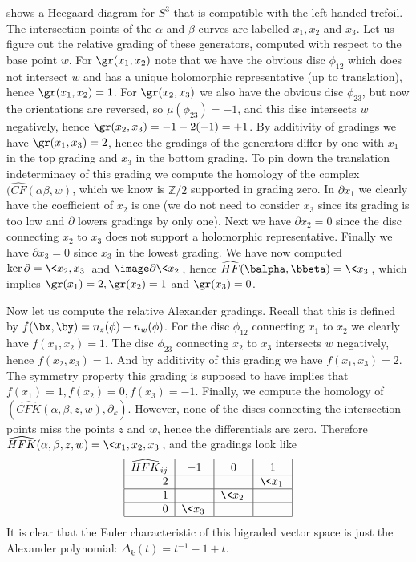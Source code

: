 \begin{example}
 shows a Heegaard diagram for $S^3$ that is compatible with the left-handed trefoil. The intersection points of the $\alpha$ and $\beta$ curves are labelled $x_1,x_2$ and $x_3$. Let us figure out the relative grading of these generators, computed with respect to the base point $w$. For $\gr(x_1,x_2)$ note that we have the obvious disc $\phi_{12}$ which does not intersect $w$ and has a unique holomorphic representative (up to translation), hence $\gr(x_1,x_2)=1$. For $\gr(x_2,x_3)$ we also have the obvious disc $\phi_{23}$, but now the orientations are reversed, so $\mu(\phi_{23})=-1$, and this disc intersects $w$ negatively, hence $\gr(x_2,x_3)=-1-2(-1)=+1$. By additivity of gradings we have $\gr(x_1,x_3)=2$, hence the gradings of the generators differ by one with $x_1$ in the top grading and $x_3$ in the bottom grading. To pin down the translation indeterminacy of this grading we compute the homology of the complex $(\widehat{CF}(\alpha\beta,w)$, which we know is $\mathbb Z/2$ supported in grading zero. In $\partial x_1$ we clearly have the coefficient of $x_2$ is one (we do not need to consider $x_3$ since its grading is too low and $\partial$ lowers gradings by only one). Next we have $\partial x_2=0$ since the disc connecting $x_2$ to $x_3$ does not support a holomorphic representative. Finally we have $\partial x_3=0$ since $x_3$ in the lowest grading. We have now computed $\ker \partial = \< x_2,x_3 \>$ and $\image \partial \< x_2 \>$, hence $\widehat{HF}(\balpha,\bbeta) = \< x_3 \>$, which implies $\gr(x_1)=2,\gr(x_2)=1$ and $\gr(x_3)=0$.

Now let us compute the relative Alexander gradings. Recall that this is defined by $f(\bx,\by)=n_z(\phi)-n_w(\phi)$. For the disc $\phi_{12}$ connecting $x_1$ to $x_2$ we clearly have $f(x_1,x_2)=1$. The disc $\phi_{23}$ connecting $x_2$ to $x_3$ intersects $w$ negatively, hence $f(x_2,x_3)=1$. And by additivity of this grading we have $f(x_1,x_3)=2$. The symmetry property this grading is supposed to have implies that $f(x_1)=1,f(x_2)=0,f(x_3)=-1$. Finally, we compute the homology of $(\widehat{CFK}(\alpha,\beta,z,w),\partial_k)$. However, none of the discs connecting the intersection points miss the points $z$ and $w$, hence the differentials are zero. Therefore $\widehat{HFK}(\alpha,\beta,z,w) = \< x_1,x_2,x_3 \>$, and the gradings look like
\[
\begin{tabular}{|r|c|c|c|}
\hline
$\widehat{HFK}_{ij}$ & $-1$ & $0$ & $1$ \\
\hline
$2$ & & & $\<x_1\>$ \\
\hline
$1$ & & $\<x_2\>$ & \\
\hline
$0$ & $\<x_3\>$ & & \\
\hline
\end{tabular}
\]
It is clear that the Euler characteristic of this bigraded vector space is just the Alexander polynomial: $\Delta_k(t)=t^{-1}-1+t$.
\end{example}




